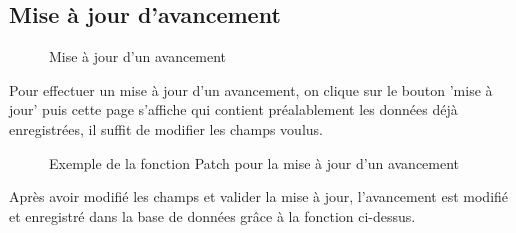 \documentclass[a4paper]{report}
\begin{document}
\begin{doublespace}
	\subsection{Mise à jour d'avancement}
	\begin{figure}[H]
		\begin{center}
			\caption{Mise à jour d'un avancement}
		\end{center}
	\end{figure}
	Pour effectuer un mise à jour d'un avancement, on clique sur le bouton 'mise à jour' puis cette page s'affiche qui contient préalablement les données déjà enregistrées, il suffit de modifier les champs voulus.
	\begin{figure}[H]
		\begin{center}
			\caption{Exemple de la fonction Patch pour la mise à jour d'un avancement}
		\end{center}
	\end{figure}
	Après avoir modifié les champs et valider la mise à jour, l'avancement est modifié et enregistré dans la base de données grâce à la fonction ci-dessus.

\end{doublespace}
\end{document}
